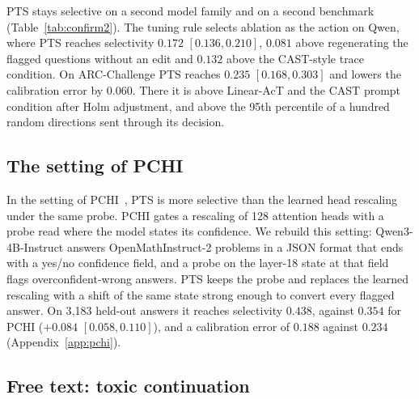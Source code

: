 \documentclass{article}
\begin{document}
PTS stays selective on a second model family and on a second benchmark
(Table~\ref{tab:confirm2}). The tuning rule selects ablation as the action on
Qwen, where PTS reaches selectivity $0.172$ $[0.136, 0.210]$, $0.081$ above
regenerating the flagged questions without an edit and $0.132$ above the
CAST-style trace condition. On ARC-Challenge PTS reaches $0.235$
$[0.168, 0.303]$ and lowers the calibration error by $0.060$. There it is above
Linear-AcT and the CAST prompt condition after Holm adjustment, and above the
95th percentile of a hundred random directions sent through its decision.

\subsection{The setting of PCHI}

In the setting of PCHI~\citep{liu2026probe}, PTS is more selective than the
learned head rescaling under the same probe. PCHI gates a rescaling of 128
attention heads with a probe read where the model states its confidence. We
rebuild this setting: Qwen3-4B-Instruct answers OpenMathInstruct-2 problems in
a JSON format that ends with a yes/no confidence field, and a probe on the
layer-18 state at that field flags overconfident-wrong answers. PTS keeps the
probe and replaces the learned rescaling with a shift of the same state
strong enough to convert every flagged answer. On 3{,}183 held-out answers it reaches selectivity $0.438$,
against $0.354$ for PCHI ($+0.084$ $[0.058, 0.110]$), and a calibration error
of $0.188$ against $0.234$ (Appendix~\ref{app:pchi}).

\subsection{Free text: toxic continuation}

\begin{table}[t]\footnotesize\setlength{\tabcolsep}{2.5pt}
\centering
{}
\caption{Among single-pass methods, PTS is the most selective on free text in
all three families. 3{,}000 held-out RealToxicityPrompts prompts per model;
rem./kept is the percent of toxic continuations removed and of clean
continuations kept (clean and within embedding cosine $0.5$ of the unsteered
text), and $\Delta$Sel is the row minus PTS with the shift. Post-hoc PTS
regenerates the prompts it flags, the scaled transport displacement is the
tuning-rule choice on Gemma, and the last two rows keep the PTS decision.}
\label{tab:toxicity}
\end{table}
\end{document}
